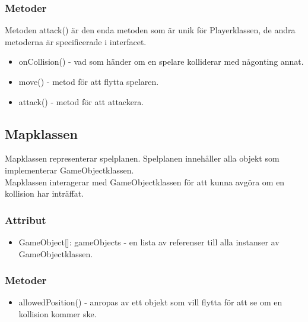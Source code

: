 \documentclass{TDP005mall}
\begin{document}
\subsubsection{Metoder}
Metoden attack() är den enda metoden som är unik för Playerklassen, de andra metoderna är specificerade i interfacet.
\begin{itemize}
  \item onCollision() - vad som händer om en spelare kolliderar med någonting annat.
  \item move() - metod för att flytta spelaren.
  \item attack() - metod för att attackera.
\end{itemize}

\newpage

\subsection{Mapklassen}
Mapklassen representerar spelplanen. Spelplanen innehåller alla objekt som implementerar GameObjectklassen. \\
Mapklassen interagerar med GameObjectklassen för att kunna avgöra om en kollision har inträffat. \\
\subsubsection{Attribut}
\begin{itemize}
  \item GameObject[]: gameObjects - en lista av referenser till alla instanser av GameObjectklassen.
\end{itemize}
\subsubsection{Metoder}
\begin{itemize}
  \item allowedPosition() - anropas av ett objekt som vill flytta för att se om en kollision kommer ske.
\end{itemize}
\end{document}
